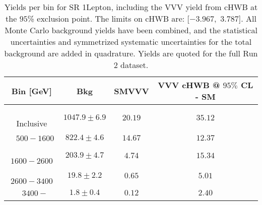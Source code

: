 \begin{table}[!htbp]
    \small
    \center
    \begin{tabular}{c||c|c|c}
    Bin [GeV] & Bkg & SMVVV & \pbox{20cm}{VVV \\ cHWB @ $95\%$ CL - SM \\ }\\
    \hline
    \pbox{20cm}{ ~ \\Inclusive\\ } & $1047.9 \pm 6.9$ & $20.19$ & $35.12$\\
    \hline
    \pbox{20cm}{ ~ \\$500-1600$\\ } & $822.4 \pm 4.6$ & $14.67$ & $12.37$\\
    \hline
    \pbox{20cm}{ ~ \\$1600-2600$\\ } & $203.9 \pm 4.7$ & $4.74$ & $15.34$\\
    \hline
    \pbox{20cm}{ ~ \\$2600-3400$\\ } & $19.8 \pm 2.2$ & $0.65$ & $5.01$\\
    \hline
    \pbox{20cm}{ ~ \\$3400-$\\ } & $1.8 \pm 0.4$ & $0.12$ & $2.40$\\
\end{tabular}
    \caption{Yields per bin for SR 1Lepton, including the VVV yield from cHWB at the $95$\% exclusion point. The limits on cHWB are: [$-3.967$,~$3.787$]. All Monte Carlo background yields have been combined, and the statistical uncertainties and symmetrized systematic uncertainties for the total background are added in quadrature. Yields are quoted for the full Run 2 dataset.}
    \label{tab:1Lepton$binssignal}
\end{table}
